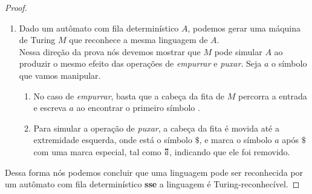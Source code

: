 \begin{proof}
\begin{enumerate}
\item Dado um autômato com fila determinístico $A$, podemos gerar uma máquina de Turing $M$ que reconhece a mesma linguagem de $A$.\\[3pt]
Nessa direção da prova nós devemos mostrar que $M$ pode simular $A$ ao produzir o mesmo efeito das operações de \textit{empurrar} e \textit{puxar}. Seja $a$ o símbolo que vamos manipular.
\begin{enumerate}
\item No caso de \textit{empurrar}, basta que a cabeça da fita de $M$ percorra a entrada e escreva $a$ ao encontrar o primeiro símbolo \textvisiblespace.
\item Para simular a operação de \textit{puxar}, a cabeça da fita é movida até a extremidade esquerda, onde está o símbolo $\$$, e marca o símbolo $a$ após $\$$ com uma marca especial, tal como $\accentset{\mbox{\large\bfseries .\hspace{-0.25ex}.}}{a}$, indicando que ele foi removido.
\end{enumerate}

\end{enumerate}

Dessa forma nós podemos concluir que uma linguagem pode ser reconhecida por um autômato com fila determinístico \textbf{sse} a linguagem é Turing-reconhecível.

\end{proof}